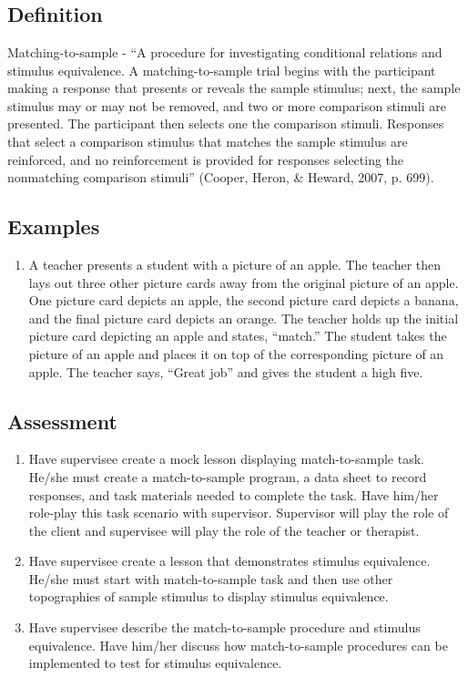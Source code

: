 \clearpage \section{\foureThirteen{}}
\subsection{Definition} 
Matching-to-sample - ``A procedure for investigating conditional relations and stimulus equivalence. A matching-to-sample trial begins with the participant making a response that presents or reveals the sample stimulus; next, the sample stimulus may or may not be removed, and two or more comparison stimuli are presented. The participant then selects one the comparison stimuli. Responses that select a comparison stimulus that matches the sample stimulus are reinforced, and no reinforcement is provided for responses selecting the nonmatching comparison stimuli'' (Cooper, Heron, \& Heward, 2007, p. 699).

\subsection{Examples}
\begin{enumerate}
\item A teacher presents a student with a picture of an apple. The teacher then lays out three other picture cards away from the original picture of an apple. One picture card depicts an apple, the second picture card depicts a banana, and the final picture card depicts an orange. The teacher holds up the initial picture card depicting an apple and states, ``match.''  The student takes the picture of an apple and places it on top of the corresponding picture of an apple. The teacher says, ``Great job'' and gives the student a high five.
\end{enumerate}
%
\subsection{Assessment}
\begin{enumerate}
\item Have supervisee create a mock lesson displaying match-to-sample task. He/she must create a match-to-sample program, a data sheet to record responses, and task materials needed to complete the task. Have him/her role-play this task scenario with supervisor. Supervisor will play the role of the client and supervisee will play the role of the teacher or therapist.
\item Have supervisee create a lesson that demonstrates stimulus equivalence. He/she must start with match-to-sample task and then use other topographies of sample stimulus to display stimulus equivalence. 
\item Have supervisee describe the match-to-sample procedure and stimulus equivalence. Have him/her discuss how match-to-sample procedures can be implemented to test for stimulus equivalence. 
\end{enumerate}
%
